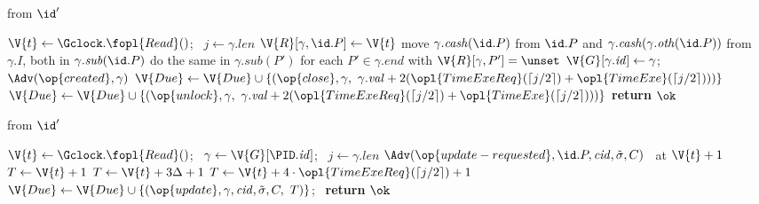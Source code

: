 \begin{interface}
{ \quad from $\id'$
\begin{algorithmic}[1]
\algcont
\State $\V{t} \gets \Gclock.\fopl{Read}()$; \ $j \gets \gamma.\mathit{len}$
\State $\V{R}[\gamma, \id.P] \gets \V{t}$
 \label{ln:chanlocknow}
  \State move $\gamma.\mathit{cash}(\id.P)$ from $\id.P$ and $\gamma.\mathit{cash}(\gamma.\mathit{oth}(\id.P))$ from $\gamma.I$, both in $\gamma.\mathit{sub}(\id.P)$
\EndIf
{}
  \State do the same in $\gamma.\mathit{sub}(P')$ for each $P' \in \gamma.\mathit{end}$ with $\V{R}[\gamma, P'] = \unset$
\EndIf
{} \label{ln:chanthree}
  \State $\V{G}[\gamma.\mathit{id}] \gets \gamma$; \ $\Adv(\op{created}, \gamma)$ \label{ln:chanINotTold}
  \State $\V{Due} \gets \V{Due} \cup \{(\op{close}, \gamma, \ \gamma.\mathit{val} + 2(\opl{TimeExeReq}(\lceil j/2 \rceil) + \opl{TimeExe}(\lceil j/2 \rceil)))\}$ \label{ln:chanautoclose}
\EndIf
{}
  \State $\V{Due} \gets \V{Due} \cup \{(\op{unlock}, \gamma, \ \gamma.\mathit{val} + 2(\opl{TimeExeReq}(\lceil j/2 \rceil) + \opl{TimeExe}(\lceil j/2 \rceil)))\}$ \label{ln:chanlatemoney}
\EndIf
\State \textbf{return} $\ok$
\algsave
\end{algorithmic}
\vspace{1.4ex}

 \quad from $\id'$
\begin{algorithmic}[1]
\algcont
\State $\V{t} \gets \Gclock.\fopl{Read}()$; \ $\gamma \gets \V{G}[\PID.\mathit{id}]$; \ $j \gets \gamma.\mathit{len}$
 \label{ln:chanendusers}
\State $\Adv(\op{update-requested}, \id.P, \mathit{cid}, \tilde{\sigma}, C)$ \ at $\V{t} + 1$
\State $T \gets \V{t} + 1$ \label{ln:chanoptimistic}
  \State $T \gets \V{t} + 3\Delta + 1$ \label{ln:chanpess1}
\EndIf
{}
  \State $T \gets \V{t} + 4 \cdot \opl{TimeExeReq}(\lceil j/2 \rceil) + 1$ \label{ln:chanpessdeep}
\EndIf
\State $\V{Due} \gets \V{Due} \cup \{(\op{update}, \gamma, \mathit{cid}, \tilde{\sigma}, C, \ T)\}$; \ \textbf{return} $\ok$
\algsave
\end{algorithmic}
\vspace{1.4ex}

}
\end{interface}
